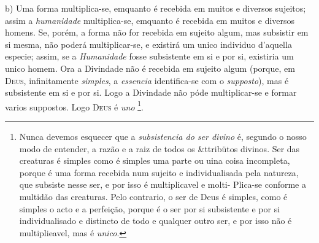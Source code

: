b) Uma forma multiplica-se, emquanto é recebida em muitos e diversos sujeitos; assim a \emph{humanidade} multiplica-se, emquanto é recebida em muitos e diversos homens. Se, porém, a forma não for recebida em sujeito algum, mas subsistir em si mesma, não poderá multiplicar-se, e existirá um unico individuo d'aquella especie; assim, se a \emph{Humanidade} fosse subsistente em si e por si, existiria um unico homem. Ora a Divindade não é recebida em sujeito algum (porque, em \textsc{Deus}, infinitamente \emph{simples}, a \emph{essencia} identifica-se com o \emph{supposto}), mas é subsistente em si e por si. Logo a Divindade não póde multiplicar-se e formar varios suppostos. Logo \textsc{Deus} é \emph{uno} \footnote{Nunca devemos esquecer que a \emph{subsistencia do ser divino} é, segundo o nosso modo de entender, a razão e a raiz de todos os \&ttribütos divinos. Ser das creaturas é simples como é simples uma parte ou uina coisa incompleta, porque é uma forma recebida num sujeito e individualisada pela natureza, que subsiste nesse ser, e por isso é multiplicavel e molti- Plica-se conforme a multidão das creaturas. Pelo contrario, o ser de Deus é simples, como é simples o acto e a perfeição, porque é o ser por si subsistente e por si individualisado e distincto de todo e qualquer outro ser, e por isso não é multiplieavel, mas é \emph{unico}.}.

